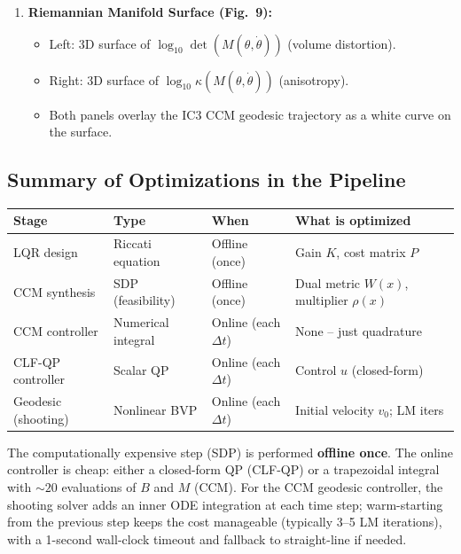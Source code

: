 \documentclass[11pt,a4paper]{article}
\begin{document}
\begin{enumerate}[leftmargin=2em]
    \item \textbf{Riemannian Manifold Surface (Fig.~9):}
    \begin{itemize}
        \item Left: 3D surface of \(\log_{10}\det(M(\theta, \dot\theta))\) (volume distortion).
        \item Right: 3D surface of \(\log_{10}\kappa(M(\theta, \dot\theta))\) (anisotropy).
        \item Both panels overlay the IC3 CCM geodesic trajectory as a white curve on the surface.
    \end{itemize}
\end{enumerate}

\subsection{Summary of Optimizations in the Pipeline}

\begin{center}
\begin{tabular}{>{\raggedright}p{3.5cm} p{3cm} p{2.5cm} p{4cm}}
\toprule
\textbf{Stage} & \textbf{Type} & \textbf{When} & \textbf{What is optimized} \\
\midrule
LQR design         & Riccati equation   & Offline (once)  & Gain \(K\), cost matrix \(P\) \\
CCM synthesis       & SDP (feasibility)  & Offline (once)  & Dual metric \(W(x)\), multiplier \(\rho(x)\) \\
CCM controller      & Numerical integral & Online (each \(\Delta t\)) & None -- just quadrature \\
CLF-QP controller   & Scalar QP          & Online (each \(\Delta t\)) & Control \(u\) (closed-form) \\
Geodesic (shooting) & Nonlinear BVP      & Online (each \(\Delta t\)) & Initial velocity \(v_0\); LM iters \\
\bottomrule
\end{tabular}
\end{center}

The computationally expensive step (SDP) is performed \textbf{offline once}.  The online controller is cheap: either a closed-form QP (CLF-QP) or a trapezoidal integral with \(\sim 20\) evaluations of \(B\) and \(M\) (CCM).  For the CCM geodesic controller, the shooting solver adds an inner ODE integration at each time step; warm-starting from the previous step keeps the cost manageable (typically 3--5 LM iterations), with a 1-second wall-clock timeout and fallback to straight-line if needed.
\end{document}
